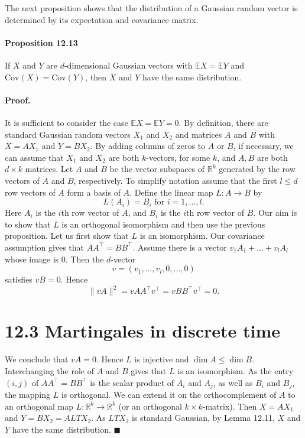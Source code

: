\documentclass{article}
\begin{document}
The next proposition shows that the distribution of a Gaussian random vector is determined by its expectation and covariance matrix.

\paragraph{Proposition 12.13} If $X$ and $Y$ are $d$-dimensional Gaussian vectors with $\mathbb{E}X = \mathbb{E}Y$ and $\text{Cov}(X) = \text{Cov}(Y)$, then $X$ and $Y$ have the same distribution.

\paragraph{Proof.} It is sufficient to consider the case $\mathbb{E}X = \mathbb{E}Y = 0$. By definition, there are standard Gaussian random vectors $X_1$ and $X_2$ and matrices $A$ and $B$ with $X = AX_1$ and $Y = BX_2$. By adding columns of zeros to $A$ or $B$, if necessary, we can assume that $X_1$ and $X_2$ are both $k$-vectors, for some $k$, and $A, B$ are both $d \times k$ matrices. Let $A$ and $B$ be the vector subspaces of $\mathbb{R}^k$ generated by the row vectors of $A$ and $B$, respectively. To simplify notation assume that the first $l \leq d$ row vectors of $A$ form a basis of $A$. Define the linear map $L : A \rightarrow B$ by
\[
L(A_i) = B_i \text{ for } i = 1, \ldots, l.
\]
Here $A_i$ is the $i$th row vector of $A$, and $B_i$ is the $i$th row vector of $B$. Our aim is to show that $L$ is an orthogonal isomorphism and then use the previous proposition. Let us first show that $L$ is an isomorphism. Our covariance assumption gives that $AA^\top = BB^\top$. Assume there is a vector $v_1 A_1 + \ldots + v_l A_l$ whose image is 0. Then the $d$-vector
\[
v = (v_1, \ldots, v_l, 0, \ldots, 0)
\]
satisfies $vB = 0$. Hence
\[
\|vA\|^2 = vAA^\top v^\top = vBB^\top v^\top = 0.
\]




\section*{12.3 Martingales in discrete time}

We conclude that $vA = 0$. Hence $L$ is injective and $\dim A \leq \dim B$. Interchanging the role of $A$ and $B$ gives that $L$ is an isomorphism. As the entry $(i, j)$ of $AA^\top = BB^\top$ is the scalar product of $A_i$ and $A_j$, as well as $B_i$ and $B_j$, the mapping $L$ is orthogonal. We can extend it on the orthocomplement of $A$ to an orthogonal map $L: \mathbb{R}^k \rightarrow \mathbb{R}^k$ (or an orthogonal $k \times k$-matrix). Then $X = AX_1$ and $Y = BX_2 = ALTX_2$. As $LT X_2$ is standard Gaussian, by Lemma 12.11, $X$ and $Y$ have the same distribution. \hfill $\blacksquare$
\end{document}
